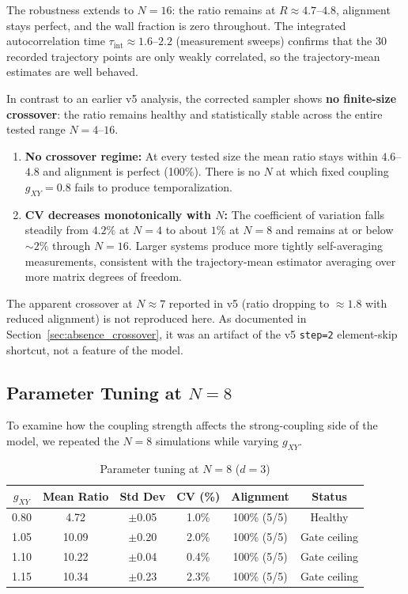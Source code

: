 \documentclass[12pt,a4paper]{article}
\begin{document}
The robustness extends to $N=16$: the ratio remains at $R \approx 4.7$--$4.8$,
alignment stays perfect, and the wall fraction is zero throughout. The
integrated autocorrelation time $\tau_{\mathrm{int}} \approx 1.6$--$2.2$
(measurement sweeps) confirms that the 30 recorded trajectory points are only
weakly correlated, so the trajectory-mean estimates are well behaved.

In contrast to an earlier v5 analysis, the corrected sampler shows
\textbf{no finite-size crossover}: the ratio remains healthy and statistically
stable across the entire tested range $N=4$--$16$.

\begin{enumerate}[leftmargin=*]
\item \textbf{No crossover regime:}
At every tested size the mean ratio stays within $4.6$--$4.8$ and alignment
is perfect (100\%). There is no $N$ at which fixed coupling
$g_{XY}=0.8$ fails to produce temporalization.

\item \textbf{CV decreases monotonically with $N$:}
The coefficient of variation falls steadily from $4.2\%$ at $N=4$ to about
$1\%$ at $N=8$ and remains at or below $\sim 2\%$ through $N=16$. Larger
systems produce more tightly self-averaging measurements, consistent with the
trajectory-mean estimator averaging over more matrix degrees of freedom.
\end{enumerate}

The apparent crossover at $N\approx 7$ reported in v5 (ratio dropping to
$\approx 1.8$ with reduced alignment) is not reproduced here. As documented
in Section~\ref{sec:absence_crossover}, it was an artifact of the v5
\texttt{step=2} element-skip shortcut, not a feature of the model.

\subsection{Parameter Tuning at $N=8$}\label{sec:n8_tuning}

To examine how the coupling strength affects the strong-coupling side of the
model, we repeated the $N=8$ simulations while varying $g_{XY}$.

\begin{table}[ht]
\centering
\caption{Parameter tuning at $N=8$ ($d=3$)}
\label{tab:n8_tuning}
\begin{tabular}{cccccc}
\toprule
$g_{XY}$ & Mean Ratio & Std Dev & CV (\%) & Alignment & Status \\
\midrule
0.80 & 4.72 & $\pm$0.05 & 1.0\% & 100\% (5/5) & Healthy \\
1.05 & 10.09 & $\pm$0.20 & 2.0\% & 100\% (5/5) & Gate ceiling \\
1.10 & 10.22 & $\pm$0.04 & 0.4\% & 100\% (5/5) & Gate ceiling \\
1.15 & 10.34 & $\pm$0.23 & 2.3\% & 100\% (5/5) & Gate ceiling \\
\bottomrule
\end{tabular}
\end{table}
\end{document}

